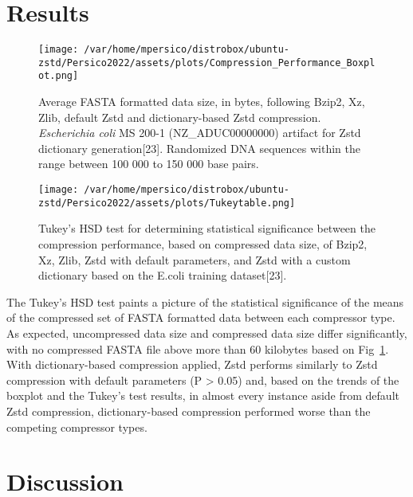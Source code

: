 \documentclass[
  10pt,
  letterpaper,
]{article}
\begin{document}
\newpage

\hypertarget{results}{%
\section{Results}\label{results}}

\begin{figure}

{\centering \texttt{[image: /var/home/mpersico/distrobox/ubuntu-zstd/Persico2022/assets/plots/Compression\_Performance\_Boxplot.png]}

}

\caption{\label{fig-performance}Average FASTA formatted data size, in
bytes, following Bzip2, Xz, Zlib, default Zstd and dictionary-based Zstd
compression. \emph{Escherichia coli} MS 200-1 (NZ\_ADUC00000000)
artifact for Zstd dictionary generation{[}23{]}. Randomized DNA
sequences within the range between 100 000 to 150 000 base pairs.}

\end{figure}

\begin{figure}

{\centering \texttt{[image: /var/home/mpersico/distrobox/ubuntu-zstd/Persico2022/assets/plots/Tukeytable.png]}

}

\caption{\label{fig-tukey}Tukey's HSD test for determining statistical
significance between the compression performance, based on compressed
data size, of Bzip2, Xz, Zlib, Zstd with default parameters, and Zstd
with a custom dictionary based on the E.coli training dataset{[}23{]}.}

\end{figure}

\newpage

The Tukey's HSD test paints a picture of the statistical significance of
the means of the compressed set of FASTA formatted data between each
compressor type. As expected, uncompressed data size and compressed data
size differ significantly, with no compressed FASTA file above more than
60 kilobytes based on Fig~\ref{fig-performance}. With dictionary-based
compression applied, Zstd performs similarly to Zstd compression with
default parameters (P \textgreater{} 0.05) and, based on the trends of
the boxplot and the Tukey's test results, in almost every instance aside
from default Zstd compression, dictionary-based compression performed
worse than the competing compressor types.

\hypertarget{discussion}{%
\section{Discussion}\label{discussion}}
\end{document}
